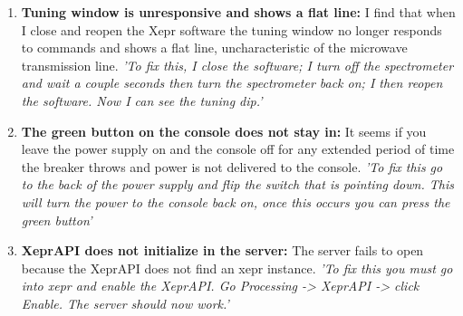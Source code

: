 \documentclass{article}
\newcommand{\fc}[1]{{\color{blue}\textit{'{#1}'}}}
\begin{document}
\begin{enumerate}
\item {\bf Tuning window is unresponsive and shows a flat line:} I find that when I close and reopen the Xepr software the tuning window no longer responds to commands and shows a flat line, uncharacteristic of the microwave transmission line. \fc{To fix this, I close the software; I turn off the spectrometer and wait a couple seconds then turn the spectrometer back on; I then reopen the software. Now I can see the tuning dip.}

\item {\bf The green button on the console does not stay in:} It seems if you leave the power supply on and the console off for any extended period of time the breaker throws and power is not delivered to the console. \fc{To fix this go to the back of the power supply and flip the switch that is pointing down. This will turn the power to the console back on, once this occurs you can press the green button}

\item {\bf XeprAPI does not initialize in the server:} The server fails to open because the XeprAPI does not find an xepr instance. \fc{To fix this you must go into xepr and enable the XeprAPI. Go Processing -> XeprAPI -> click Enable. The server should now work.}

\end{enumerate}

{}

\end{document}
